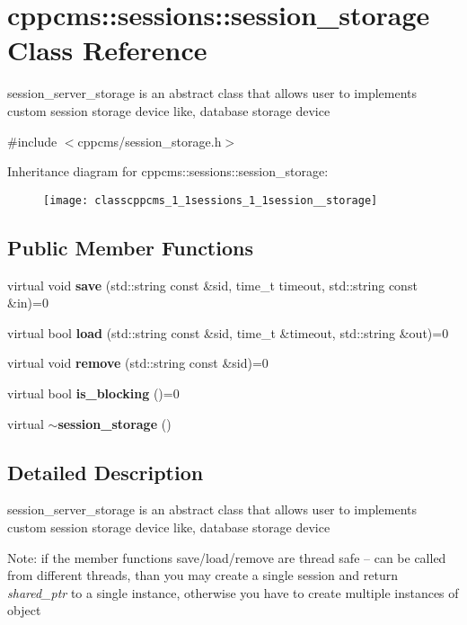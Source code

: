 \section{cppcms\-:\-:sessions\-:\-:session\-\_\-storage Class Reference}
\label{classcppcms_1_1sessions_1_1session__storage}


session\-\_\-server\-\_\-storage is an abstract class that allows user to implements custom session storage device like, database storage device  




{\ttfamily \#include $<$cppcms/session\-\_\-storage.\-h$>$}

Inheritance diagram for cppcms\-:\-:sessions\-:\-:session\-\_\-storage\-:\begin{figure}[H]
\begin{center}
\leavevmode
\texttt{[image: classcppcms\_1\_1sessions\_1\_1session\_\_storage]}
\end{center}
\end{figure}
\subsection*{Public Member Functions}
\begin{DoxyCompactItemize}
\item 
virtual void {\bf save} (std\-::string const \&sid, time\-\_\-t timeout, std\-::string const \&in)=0
\item 
virtual bool {\bf load} (std\-::string const \&sid, time\-\_\-t \&timeout, std\-::string \&out)=0
\item 
virtual void {\bf remove} (std\-::string const \&sid)=0
\item 
virtual bool {\bf is\-\_\-blocking} ()=0
\item 
virtual {\bf $\sim$session\-\_\-storage} ()
\end{DoxyCompactItemize}


\subsection{Detailed Description}
session\-\_\-server\-\_\-storage is an abstract class that allows user to implements custom session storage device like, database storage device 

Note\-: if the member functions save/load/remove are thread safe -- can be called from different threads, than you may create a single session and return {\itshape shared\-\_\-ptr} to a single instance, otherwise you have to create multiple instances of object 

